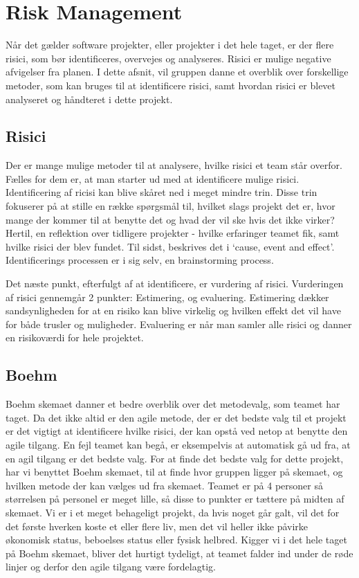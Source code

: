 \chapter{Risk Management}\label{ch:Risk Management}

Når det gælder software projekter, eller projekter i det hele taget, er der flere risici, som bør identificeres, overvejes og analyseres. Risici er mulige negative afvigelser fra planen.\cite{SlideRiskAnalysis} I dette afsnit, vil gruppen danne et overblik over forskellige metoder, som kan bruges til at identificere risici, samt hvordan risici er blevet analyseret og håndteret i dette projekt.

\section{Risici}

Der er mange mulige metoder til at analysere, hvilke risici et team står overfor. Fælles for dem er, at man starter ud med at identificere mulige risici.
Identificering af ricisi kan blive skåret ned i meget mindre trin.\cite{SlideRiskAnalysis} Disse trin fokuserer på at stille en række spørgsmål til, hvilket slags projekt det er, hvor mange der kommer til at benytte det og hvad der vil ske hvis det ikke virker? Hertil, en reflektion over tidligere projekter - hvilke erfaringer teamet fik, samt hvilke risici der blev fundet. Til sidst, beskrives det i ‘cause, event and effect’. Identificerings processen er i sig selv, en brainstorming process.

Det næste punkt, efterfulgt af at identificere, er vurdering af risici. Vurderingen af risici gennemgår 2 punkter: Estimering, og evaluering. Estimering dækker sandsynligheden for at en risiko kan blive virkelig og hvilken effekt det vil have for både trusler og muligheder. Evaluering er når man samler alle risici og danner en risikoværdi for hele projektet.

\section{Boehm}

Boehm skemaet danner et bedre overblik over det metodevalg, som teamet har taget. Da det ikke altid er den agile metode, der er det bedste valg til et projekt er det vigtigt at identificere hvilke risici, der kan opstå ved netop at benytte den agile tilgang. En fejl teamet kan begå, er eksempelvis at automatisk gå ud fra, at en agil tilgang er det bedste valg. For at finde det bedste valg for dette projekt, har vi benyttet Boehm skemaet, til at finde hvor gruppen ligger på skemaet, og hvilken metode der kan vælges ud fra skemaet.
Teamet er på 4 personer så størrelsen på personel er meget lille, så disse to punkter er tættere på midten af skemaet. Vi er i et meget behageligt projekt, da hvis noget går galt, vil det for det første hverken koste et eller flere liv, men det vil heller ikke påvirke økonomisk status, beboelses status eller fysisk helbred. Kigger vi i det hele taget på Boehm skemaet, bliver det hurtigt tydeligt, at teamet falder ind under de røde linjer og derfor den agile tilgang være fordelagtig.

